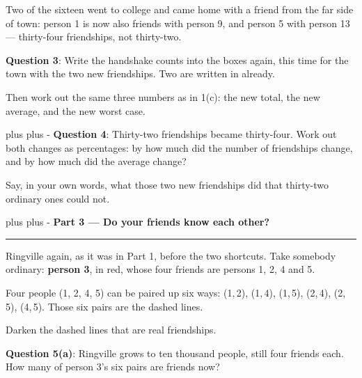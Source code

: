 \documentclass[a4paper, 14pt]{extarticle}
\newcommand{\needroom}[1]{%
  \par
  \begingroup
    \setlength{\dimen0}{#1}%
    \vskip 0pt plus \dimen0
    \penalty -100%
    \vskip 0pt plus -\dimen0
  \endgroup}
\newcommand{\parthead}[2]{%
  \needroom{6\baselineskip}%
  \partheadhere{#1}{#2}}
\newcommand{\partheadhere}[2]{%
  \vspace{0.5em}
  {\large\bfseries Part #1 --- #2}\par
  \vspace{-0.4em}\rule{\textwidth}{0.8pt}\par
  \vspace{0.1em}}
\begin{document}
Two of the sixteen went to college and came home with a friend from the far
side of town: person 1 is now also friends with person 9, and person 5 with
person 13 --- thirty-four friendships, not thirty-two.

\vspace{-0.4em}
\begin{center}
\end{center}
\vspace{-0.5em}

{\bf Question 3}: Write the handshake counts into the boxes again, this time for
the town with the two new friendships. Two are written in already.

Then work out the same three numbers as in 1(c): the new total, the new
average, and the new worst case.

\needroom{3\baselineskip}%
{\bf Question 4}: Thirty-two friendships became thirty-four. Work out both
changes as percentages: by how much did the number of friendships change, and by
how much did the average change?

Say, in your own words, what those two new friendships did that thirty-two
ordinary ones could not.

\parthead{3}{Do your friends know each other?}

\begin{minipage}[c]{0.44\textwidth}
\setlength{\parskip}{0.38em}
Ringville again, as it was in Part 1, before the two shortcuts. Take somebody
ordinary: \textbf{person 3}, in red, whose four friends are persons 1, 2, 4
and 5.

Four people (1, 2, 4, 5) can be paired up six ways: (1,\,2), (1,\,4),
(1,\,5), (2,\,4), (2,\,5), (4,\,5). Those six pairs are the dashed lines.

Darken the dashed lines that are real friendships.
\end{minipage}
\hfill
\begin{minipage}[c]{0.52\textwidth}
\begin{center}
\resizebox{0.93\textwidth}{!}{\hoodfig{}}
\end{center}
\end{minipage}

\vspace{0.3em}

{\bf Question 5(a)}: Ringville grows to ten thousand people, still four friends
each. How many of person 3's six pairs are friends now?
\end{document}

